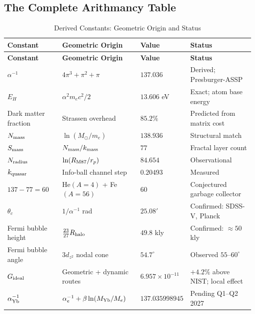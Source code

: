 \documentclass[11pt,a4paper]{article}
\begin{document}
\subsection{The Complete Arithmancy Table}

\begin{longtable}{|p{2.8cm}|p{3.2cm}|p{2cm}|p{3cm}|}
\caption{Derived Constants: Geometric Origin and Status}\\
\hline
\textbf{Constant} & \textbf{Geometric Origin} & \textbf{Value} &
  \textbf{Status}\\
\hline\endfirsthead
\hline\textbf{Constant} & \textbf{Geometric Origin} & \textbf{Value} &
  \textbf{Status}\\\hline\endhead
\hline\endfoot\hline\endlastfoot
$\alpha^{-1}$          
  & $4\pi^3+\pi^2+\pi$               
  & $137.036$
  & Derived; Presburger-ASSP \\
\hline
$E_H$                  
  & $\alpha^2 m_e c^2/2$             
  & $13.606$ eV
  & Exact; atom base energy \\
\hline
Dark matter fraction   
  & Strassen overhead                 
  & $85.2\%$
  & Predicted from matrix cost \\
\hline
$N_{\rm mass}$         
  & $\ln(M_\odot/m_e)$               
  & $138.936$
  & Structural match \\
\hline
$S_{\rm mass}$         
  & $N_{\rm mass}/k_{\rm mass}$   
  & $77$
  & Fractal layer count \\
\hline
$N_{\rm radius}$       
  & $\ln(R_{\rm M87}/r_p)$           
  & $84.654$
  & Observational \\
\hline
$k_{\rm quasar}$       
  & Info-ball channel step            
  & $0.20493$
  & Measured \\
\hline
$137-77=60$            
  & He$(A=4)$ + Fe$(A=56)$           
  & $60$
  & Conjectured garbage collector \\
\hline
$\theta_c$             
  & $1/\alpha^{-1}$ rad              
  & $25.08'$
  & Confirmed: SDSS-V, Planck \\
\hline
Fermi bubble height    
  & $\frac{23}{27}R_{\rm halo}$      
  & $49.8$ kly
  & Confirmed: $\approx50$ kly \\
\hline
Fermi bubble angle     
  & $3d_{z^2}$ nodal cone            
  & $54.7^\circ$
  & Observed $55$--$60^\circ$ \\
\hline
$G_{\rm ideal}$        
  & Geometric + dynamic routes        
  & $6.957\times10^{-11}$
  & $+4.2\%$ above NIST; local effect \\
\hline
$\alpha^{-1}_{\rm Yb}$ 
  & $\alpha^{-1}_e+\beta\ln(M_{\rm Yb}/M_e)$
  & $137.035998945$ 
  & Pending Q1--Q2 2027 \\
\hline
\end{longtable}
\end{document}

